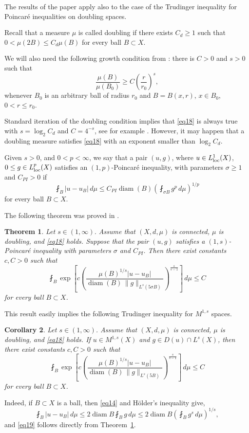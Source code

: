 \documentclass[12pt,leqno]{amsart}
\newtheorem{theorem}{Theorem}
\newtheorem{corollary}[theorem]{Corollary}
\theoremstyle{definition}
\def\diam{\operatorname{diam}}
\numberwithin{theorem}{section} \numberwithin{equation}{section}
\begin{document}
The results of the paper apply also to the case of the Trudinger inequality for Poincar\'e inequalities on doubling spaces. 

Recall that a measure $\mu$ is called doubling if there exists $C_d\geq 1$ such that $0<\mu(2B)\leq C_d\mu(B)$ for every ball $B\subset X$. 

We will also need the following growth condition from \cite[(21)]{SMP}: there is $C>0$ and $s>0$ such that
\begin{equation}
\label{eq18}
\frac{\mu(B)}{\mu(B_0)}
\geq C\left(\frac{r}{r_0}\right)^s,
\end{equation}
whenever $B_0$ is an arbitrary ball of radius $r_0$ and $B=B(x,r)$, $x\in B_0$, $0<r\leq r_0$.

Standard iteration of the doubling condition implies that \eqref{eq18} is always true with $s=\log_2 C_d$ and $C=4^{-s}$, see for example \cite[Lemma~4.7]{hajlasz}. However, it may happen that a doubling measure satisfies \eqref{eq18} with an exponent smaller than $\log_2 C_d$.


Given $s>0$, and $0<p<\infty$, we say that a pair $(u,g)$, where $u\in L^1_{\rm loc}(X)$, $0\leq g\in L^p_{\rm loc}(X)$ satisfies an
$(1,p)$-Poincar\'e inequality, with parameters $\sigma\geq 1$ and
$C_{PI}>0$ if
\[
\fint_B |u-u_B|\,d\mu
\leq C_{PI}\operatorname{diam}(B)
\left(\fint_{\sigma B} g^p\,d\mu\right)^{1/p}
\]
for every ball $B\subset X$. 

The following theorem was proved in \cite[Theorem~6.1]{SMP}.
\begin{theorem}
\label{T4}
Let $s\in (1,\infty)$. Assume that $(X,d,\mu)$ is connected, $\mu$ is doubling,
and \eqref{eq18} holds. Suppose that the pair $(u,g)$ satisfies
a $(1,s)$-Poincar\'e inequality with parameters $\sigma$ and
$C_{PI}$. Then there exist constants $c,C>0$ such that
\[
\fint_B
\exp\left[
c\left(
\frac{\mu(B)^{1/s}|u-u_B|}
{\operatorname{diam}(B)\,
\|g\|_{L^s(5\sigma B)}}
\right)^{\frac{s}{s-1}}
\right]\,d\mu
\leq C
\]
for every ball $B\subset X$.
\end{theorem}
This result easily implies the following Trudinger inequality for $M^{1,s}$ spaces.
\begin{corollary}
\label{T5}
Let $s\in (1,\infty)$. Assume that $(X,d,\mu)$ is connected, $\mu$ is doubling,
and \eqref{eq18} holds. If $u\in M^{1,s}(X)$ and $g\in D(u)\cap L^s(X)$, then there exist constants $c,C>0$ such that
\begin{equation}
\label{eq19}
\fint_B
\exp\left[
c\left(
\frac{\mu(B)^{1/s}|u-u_B|}
{\operatorname{diam}(B)\,
\|g\|_{L^s(5B)}}
\right)^{\frac{s}{s-1}}
\right]\,d\mu
\leq C
\end{equation}
for every ball $B\subset X$.
\end{corollary}
Indeed, if $B\subset X$ is a ball, then \eqref{eq14} and H\"older's inequality give,
\[
\fint_B|u-u_B|\,d\mu
\leq 2\diam B \fint_Bg\,d\mu
\leq 2\diam B \left(\fint_Bg^s\,d\mu\right)^{1/s},
\]
and \eqref{eq19} follows directly from Theorem~\ref{T4}.
\end{document}
